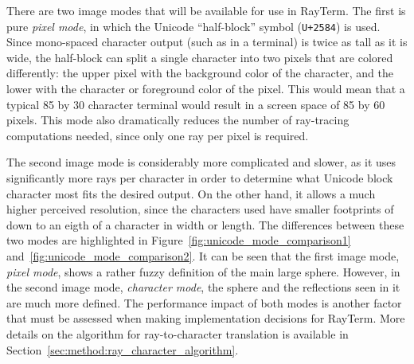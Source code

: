 \documentclass[11pt]{article}
\newcommand{\name}{{\sc RayTerm}}
\begin{document}
There are two image modes that will be available for use in \name.
The first is pure {\it pixel mode}, in which the Unicode ``half-block'' symbol (\texttt{U+2584}) is used.
Since mono-spaced character output (such as in a terminal) is twice as tall as it is wide, the half-block can split a single character into two pixels that are colored differently: the upper pixel with the background color of the character, and the lower with the character or foreground color of the pixel.
This would mean that a typical 85 by 30 character terminal would result in a screen space of 85 by 60 pixels.
This mode also dramatically reduces the number of ray-tracing computations needed, since only one ray per pixel is required.

The second image mode is considerably more complicated and slower, as it uses significantly more rays per character in order to determine what Unicode block character most fits the desired output.
On the other hand, it allows a much higher perceived resolution, since the characters used have smaller footprints of down to an eigth of a character in width or length.
The differences between these two modes are highlighted in Figure~\ref{fig:unicode_mode_comparison1} and~\ref{fig:unicode_mode_comparison2}.
It can be seen that the first image mode, {\it pixel mode}, shows a rather fuzzy definition of the main large sphere.
However, in the second image mode, {\it character mode}, the sphere and the reflections seen in it are much more defined.
The performance impact of both modes is another factor that must be assessed when making implementation decisions for \name.
More details on the algorithm for ray-to-character translation is available in Section~\ref{sec:method:ray_character_algorithm}.
\end{document}
